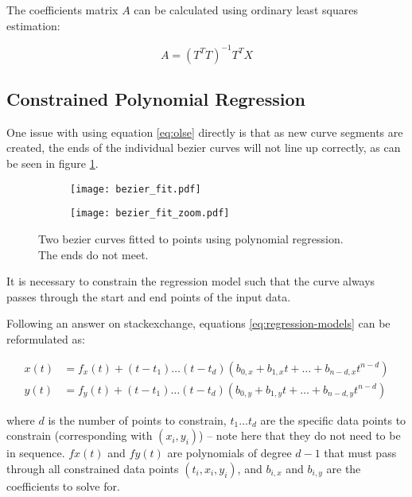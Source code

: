 The  coefficients matrix $A$ can be calculated  using  ordinary  least  squares
estimation:

\begin{equation}
    A = (T^T T)^{-1} T^T X
    \label{eq:olse}
\end{equation}

\subsection{Constrained Polynomial Regression}

One  issue  with  using equation \ref{eq:olse} directly is that  as  new  curve
segments are created, the ends of the individual bezier curves will not line up
correctly, as can be seen in figure \ref{fig:bezier_fit}.

\begin{figure}
    \centering
    \begin{subfigure}{.45\linewidth}
        \centering
        \texttt{[image: bezier\_fit.pdf]}
        \caption{}
    \end{subfigure}
        \begin{subfigure}{.45\linewidth}
        \centering
        \texttt{[image: bezier\_fit\_zoom.pdf]}
        \caption{}
    \end{subfigure}
    \caption{Two bezier curves fitted to points using polynomial regression.\\The ends do not meet.}
    \label{fig:bezier_fit}
\end{figure}

It is necessary to constrain the regression model  such  that  the curve always
passes through the start and end points of the input data.

Following    an   answer   on   stackexchange\cite{web:constrained-regression},
equations \ref{eq:regression-models} can be reformulated as:

\begin{align}
    x(t) &= f_x(t) + (t-t_1)\ldots(t-t_d)(b_{0,x} + b_{1,x} t + \ldots + b_{n-d,x} t^{n-d}) \\
    y(t) &= f_y(t) + (t-t_1)\ldots(t-t_d)(b_{0,y} + b_{1,y} t + \ldots + b_{n-d,y} t^{n-d})
\end{align}

where  $d$  is  the  number  of points to constrain, $t_1 \ldots t_d$  are  the
specific data points to constrain (corresponding with $(x_i,y_i)$) -- note here
that they do not need to be in sequence. $fx(t)$ and $fy(t)$ are polynomials of
degree   $d-1$   that   must   pass   through  all  constrained   data   points
$(t_i,x_i,y_i)$, and $b_{i,x}$ and $b_{i,y}$ are the coefficients to solve for.

